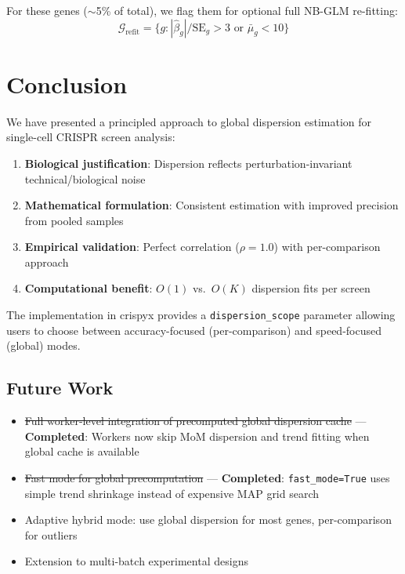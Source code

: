 \documentclass[11pt]{article}
\theoremstyle{definition}
\theoremstyle{remark}
\begin{document}
For these genes ($\sim$5\% of total), we flag them for optional full NB-GLM re-fitting:
\begin{equation}
\mathcal{G}_{\text{refit}} = \{g : |\hat{\beta}_g|/\text{SE}_g > 3 \text{ or } \bar{\mu}_g < 10\}
\end{equation}

\section{Conclusion}

We have presented a principled approach to global dispersion estimation for single-cell CRISPR screen analysis:

\begin{enumerate}
    \item \textbf{Biological justification}: Dispersion reflects perturbation-invariant technical/biological noise
    \item \textbf{Mathematical formulation}: Consistent estimation with improved precision from pooled samples
    \item \textbf{Empirical validation}: Perfect correlation ($\rho = 1.0$) with per-comparison approach
    \item \textbf{Computational benefit}: $O(1)$ vs.\ $O(K)$ dispersion fits per screen
\end{enumerate}

The implementation in crispyx provides a \texttt{dispersion\_scope} parameter allowing users to choose between accuracy-focused (per-comparison) and speed-focused (global) modes.

\subsection{Future Work}

\begin{itemize}
    \item \sout{Full worker-level integration of precomputed global dispersion cache} --- \textbf{Completed}: Workers now skip MoM dispersion and trend fitting when global cache is available
    \item \sout{Fast mode for global precomputation} --- \textbf{Completed}: \texttt{fast\_mode=True} uses simple trend shrinkage instead of expensive MAP grid search
    \item Adaptive hybrid mode: use global dispersion for most genes, per-comparison for outliers
    \item Extension to multi-batch experimental designs
\end{itemize}
\end{document}
